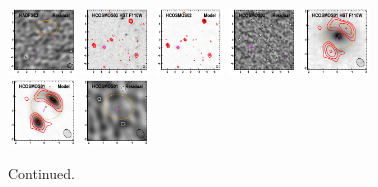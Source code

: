 \documentclass[iop]{emulateapj}
\begin{document}
\begin{figure}[!tbp]
\begin{centering}
\includegraphics[width=0.162\textwidth]{../Figures/modelfit/HADFS03_residual_bestfit.pdf}
\includegraphics[width=0.162\textwidth]{../Figures/modelfit/HCOSMOS02_optical_bestfit.pdf}
\includegraphics[width=0.162\textwidth]{../Figures/modelfit/HCOSMOS02_model_bestfit.pdf}
\includegraphics[width=0.162\textwidth]{../Figures/modelfit/HCOSMOS02_residual_bestfit.pdf}
\includegraphics[width=0.162\textwidth]{../Figures/modelfit/HCOSMOS01_optical_bestfit.pdf}
\includegraphics[width=0.162\textwidth]{../Figures/modelfit/HCOSMOS01_model_bestfit.pdf}
\includegraphics[width=0.162\textwidth]{../Figures/modelfit/HCOSMOS01_residual_bestfit.pdf}
\end{centering}

\caption{ Continued.}

\end{figure}
\end{document}
